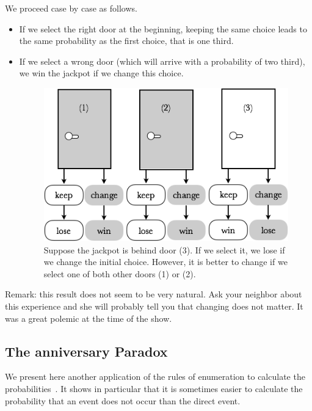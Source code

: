 We proceed case by case as follows.
\begin{itemize}
\item
If we select the right door at the beginning, keeping the same choice leads to the same probability 
as the first choice, that is one third.
\item
If we select a wrong door (which will arrive with a probability of two third), we win the jackpot if we change this choice.
\begin{figure}[h]
\begin{center}
        \includegraphics[scale=0.4]{FiguresMaths/MonthyHall}
        \caption{Suppose the jackpot is behind door (3). 
        If we select it, we lose if we change the initial choice.
        However, it is better to change if we select one of both other doors (1) or (2).}
        \label{fig:MonthyHall-2}
\end{center}
\end{figure}
\end{itemize}

Remark: this result does not seem to be very natural. Ask your neighbor about this experience
and she will probably tell you that changing does not matter.
It was a great polemic at the time of the show.


\subsection{The anniversary Paradox}

We present here another application of the rules of enumeration to calculate the probabilities~\cite{DumasTrystram}.
It shows in particular that it is sometimes easier to calculate the probability that an event does not occur than the direct
event. 

